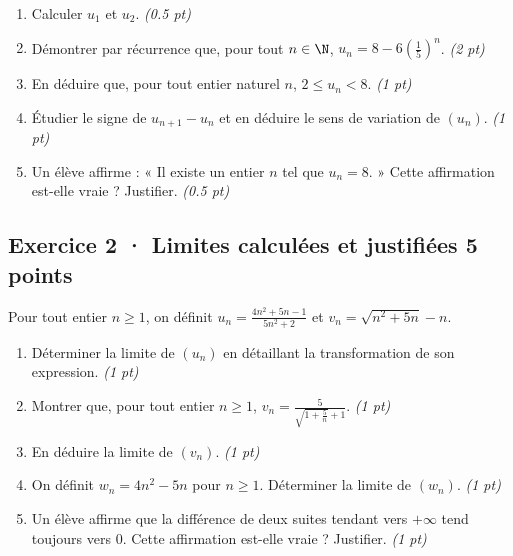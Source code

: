 \begin{enumerate}

\item Calculer $u_1$ et $u_2$. \hfill\textit{(\num{0,5} pt)}

\item Démontrer par récurrence que, pour tout $n\in\N$, $u_n=8-6\left(\frac{1}{5}\right)^n$. \hfill\textit{(2 pt)}

\item En déduire que, pour tout entier naturel $n$, $2\le u_n<8$. \hfill\textit{(1 pt)}

\item Étudier le signe de $u_{n+1}-u_n$ et en déduire le sens de variation de $(u_n)$. \hfill\textit{(1 pt)}

\item Un élève affirme : « Il existe un entier $n$ tel que $u_n=8$. » Cette affirmation est-elle vraie ? Justifier. \hfill\textit{(\num{0,5} pt)}

\end{enumerate}

\subsection*{Exercice 2 · Limites calculées et justifiées \hfill 5 points}Pour tout entier $n\ge1$, on définit $u_n=\frac{4n^2+5n-1}{5n^2+2}$ et $v_n=\sqrt{n^2+5n}-n$.

\begin{enumerate}

\item Déterminer la limite de $(u_n)$ en détaillant la transformation de son expression. \hfill\textit{(1 pt)}

\item Montrer que, pour tout entier $n\ge1$, $v_n=\frac{5}{\sqrt{1+\frac{5}n}+1}$. \hfill\textit{(1 pt)}

\item En déduire la limite de $(v_n)$. \hfill\textit{(1 pt)}

\item On définit $w_n=4n^2-5n$ pour $n\ge1$. Déterminer la limite de $(w_n)$. \hfill\textit{(1 pt)}

\item Un élève affirme que la différence de deux suites tendant vers $+\infty$ tend toujours vers $0$. Cette affirmation est-elle vraie ? Justifier. \hfill\textit{(1 pt)}

\end{enumerate}

